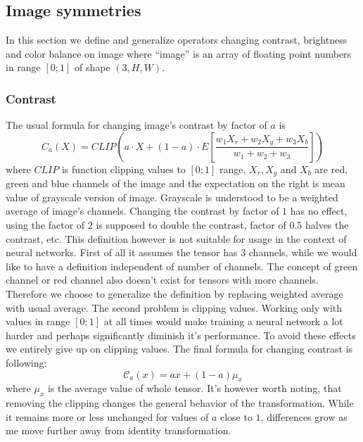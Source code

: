 \subsection{Image symmetries}
    \label{sec:transformations}
    In this section we define and generalize operators changing contrast,
    brightness and color balance on image where ``image'' is an array of
    floating point numbers in range $\left[0;1\right]$ of shape $\left(3, H,
    W\right)$.
    \subsubsection{Contrast}
    \newcommand\mcc{\mathcal{C}}
        The usual formula for changing image's contrast by factor of $a$ is $$
        C_a(X) = \mathit{CLIP}\left(a\cdot X + (1-a) \cdot E\left[ \frac{w_1X_r
        + w_2X_g + w_3X_b}{w_1+w_2+w_3}\right]   \right) $$ where
        $\mathit{CLIP}$ is function clipping values to $\left[0;1\right]$ range,
        $X_r, X_g$ and $X_b$ are red, green and blue channels of the image and
        the expectation on the right is mean value of grayscale version of
        image.  Grayscale is understood to be a weighted average of image's
        channels.  Changing the contrast by factor of $1$ has no effect, using
        the factor of $2$ is supposed to double the contrast, factor of $0.5$
        halves the contrast, etc.  This definition however is not suitable for
        usage in the context of neural networks.  First of all it assumes the
        tensor has 3 channels, while we would like to have a definition
        independent of number of channels. The concept of green channel or red
        channel also doesn't exist for tensors with more channels. Therefore we
        choose to generalize the definition by replacing weighted average with
        usual average. The second problem is clipping values. Working only with
        values in range $\left[0;1\right]$ at all times would make training a
        neural network a lot harder and perhaps significantly diminish it's
        performance. To avoid these effects we entirely give up on clipping
        values.  The final formula for changing contrast is following:
        \begin{equation}
            \label{contrast}
            \mathcal{C}_a(x) = ax + (1-a) \mu_x
        \end{equation}
        where $\mu_x$ is the average value of whole tensor. It's however worth
        noting, that removing the clipping changes the general behavior of the
        transformation.  While it remains more or less unchanged for values of
        $a$ close to $1$, differences grow as me move further away from identity
        transformation.

